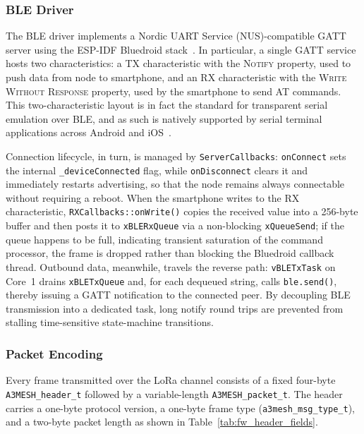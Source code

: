 \documentclass[english,bachelor]{tfgitic}[2026/01/22]
\begin{document}
\subsubsection{BLE Driver}
\label{sec:fw_ble_driver}

The BLE driver implements a Nordic UART Service (NUS)-compatible GATT server using
the ESP-IDF Bluedroid stack~\cite{espressif2023espidf}. In particular, a single
GATT service hosts two characteristics: a TX characteristic with the
\textsc{Notify} property, used to push data from node to smartphone, and an RX
characteristic with the \textsc{Write Without Response} property, used by the
smartphone to send AT commands. This two-characteristic layout is in fact the
standard for transparent serial emulation over BLE, and as such is natively
supported by serial terminal applications across Android and
iOS~\cite{bluetooth2023core}.

Connection lifecycle, in turn, is managed by \texttt{ServerCallbacks}:
\texttt{onConnect} sets the internal \texttt{\_deviceConnected} flag, while
\texttt{onDisconnect} clears it and immediately restarts advertising, so that the
node remains always connectable without requiring a reboot. When the smartphone
writes to the RX characteristic, \texttt{RXCallbacks::onWrite()} copies the
received value into a 256-byte buffer and then posts it to \texttt{xBLERxQueue} via
a non-blocking \texttt{xQueueSend}; if the queue happens to be full, indicating
transient saturation of the command processor, the frame is dropped rather than
blocking the Bluedroid callback thread. Outbound data, meanwhile, travels the
reverse path: \texttt{vBLETxTask} on Core~1 drains \texttt{xBLETxQueue} and, for
each dequeued string, calls \texttt{ble.send()}, thereby issuing a GATT
notification to the connected peer. By decoupling BLE transmission into a
dedicated task, long notify round trips are prevented from stalling time-sensitive
state-machine transitions.

\subsubsection{Packet Encoding}
\label{sec:fw_packet}

Every frame transmitted over the LoRa channel consists of a fixed four-byte
\texttt{A3MESH\_header\_t} followed by a variable-length \texttt{A3MESH\_packet\_t}.
The header carries a one-byte protocol version, a one-byte frame type
(\texttt{a3mesh\_msg\_type\_t}), and a two-byte packet length as shown in Table~\ref{tab:fw_header_fields}. 
\end{document}
